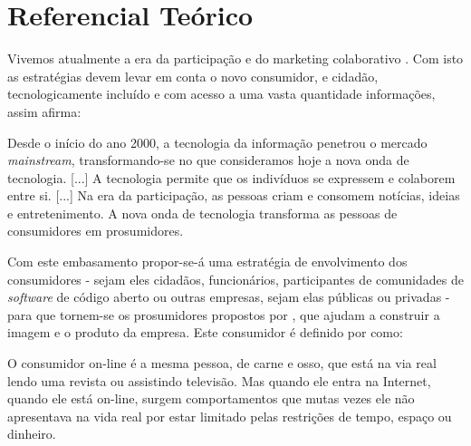\chapter{Referencial Teórico}

Vivemos atualmente a era da participação e do marketing colaborativo \cite{Kotler2010}. Com isto as estratégias devem levar em conta o novo consumidor, e cidadão, tecnologicamente incluído e com acesso a uma vasta quantidade informações, assim  afirma:
\begin{citacao}
Desde o início do ano 2000, a tecnologia da informação penetrou o mercado \textit{mainstream}, transformando-se no que consideramos hoje a nova onda de tecnologia. [...] A tecnologia permite que os indivíduos se expressem e colaborem entre si. [...] Na era da participação, as pessoas criam e consomem notícias, ideias e entretenimento. A nova onda de tecnologia transforma as pessoas de consumidores em prosumidores.
\end{citacao}

Com este embasamento propor-se-á uma estratégia de envolvimento dos consumidores - sejam eles cidadãos, funcionários, participantes de comunidades de \textit{software} de código aberto ou outras empresas, sejam elas públicas ou privadas - para que tornem-se os prosumidores propostos por , que ajudam a construir a imagem e o produto da empresa. Este consumidor é definido por  como:
\begin{citacao}
O consumidor on-line é a mesma pessoa, de carne e osso, que está na via real lendo uma revista ou assistindo televisão. Mas quando ele entra na Internet, quando ele está on-line, surgem comportamentos que mutas vezes ele não apresentava na vida real por estar limitado pelas restrições de tempo, espaço ou dinheiro.
\end{citacao}
